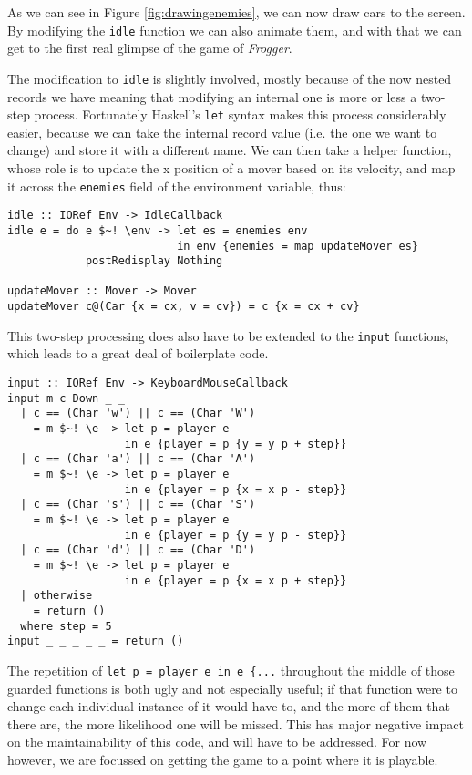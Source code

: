 \documentclass[12pt, a4paper]{report}
\begin{document}
As we can see in Figure \ref{fig:drawingenemies}, we can now draw cars to the screen.
By modifying the \verb|idle| function we can also animate them, and with that we can get to the first real glimpse of the game of \textit{Frogger}.

\par

The modification to \verb|idle| is slightly involved, mostly because of the now nested records we have meaning that modifying an internal one is more or less a two-step process.
Fortunately Haskell's \verb|let| syntax makes this process considerably easier, because we can take the internal record value (i.e. the one we want to change) and store it with a different name.
We can then take a helper function, whose role is to update the x position of a mover based on its velocity, and map it across the \verb|enemies| field of the environment variable, thus:

\begin{lstlisting}
idle :: IORef Env -> IdleCallback
idle e = do e $~! \env -> let es = enemies env
                          in env {enemies = map updateMover es}
            postRedisplay Nothing

updateMover :: Mover -> Mover
updateMover c@(Car {x = cx, v = cv}) = c {x = cx + cv}
\end{lstlisting}

This two-step processing does also have to be extended to the \verb|input| functions, which leads to a great deal of boilerplate code.

\begin{lstlisting}
input :: IORef Env -> KeyboardMouseCallback
input m c Down _ _
  | c == (Char 'w') || c == (Char 'W')
    = m $~! \e -> let p = player e
                  in e {player = p {y = y p + step}}
  | c == (Char 'a') || c == (Char 'A')
    = m $~! \e -> let p = player e
                  in e {player = p {x = x p - step}}
  | c == (Char 's') || c == (Char 'S')
    = m $~! \e -> let p = player e
                  in e {player = p {y = y p - step}}
  | c == (Char 'd') || c == (Char 'D')
    = m $~! \e -> let p = player e
                  in e {player = p {x = x p + step}}
  | otherwise
    = return ()
  where step = 5
input _ _ _ _ _ = return ()
\end{lstlisting}

The repetition of \verb|let p = player e in e {...| throughout the middle of those guarded functions is both ugly and not especially useful; if that function were to change each individual instance of it would have to, and the more of them that there are, the more likelihood one will be missed.
This has major negative impact on the maintainability of this code, and will have to be addressed.
For now however, we are focussed on getting the game to a point where it is playable.
\end{document}
